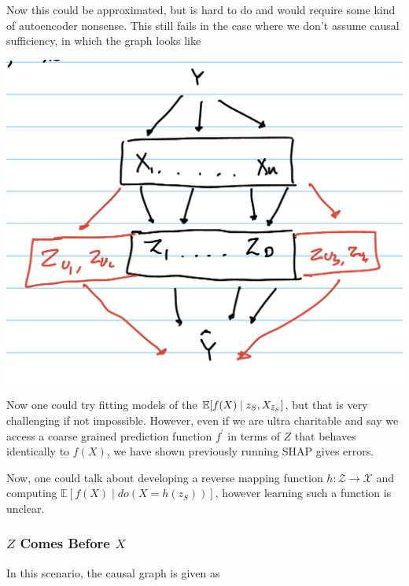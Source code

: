 \documentclass{article}
\begin{document}
Now this could be approximated, but is hard to do and would require some kind of autoencoder nonsense. This still fails in the case where we don't assume causal sufficiency, in which the graph looks like
\begin{center}
\includegraphics[scale=0.2]{Z_after_X_no_sufficiency.jpeg}
\end{center}

Now one could try fitting models of the $\mathbb{E}[f(X) \mid z_S, X_{\Bar{z}_S}]$, but that is very challenging if not impossible. However, even if we are ultra charitable and say we access a coarse grained prediction function $f^\prime$ in terms of $Z$ that behaves identically to $f(X)$, we have shown previously running SHAP gives errors. 

Now, one could talk about developing a reverse mapping function $h: \mathcal{Z} \rightarrow \mathcal{X}$ and computing $\mathbb{E}[f(X) \mid do(X = h(z_S))]$, however learning such a function is unclear. 

\subsubsection{$Z$ Comes Before $X$}

In this scenario, the causal graph is given as
\end{document}
